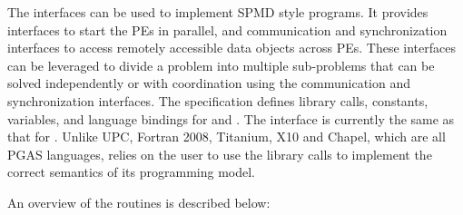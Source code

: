 
The \openshmem{} interfaces can be used to implement \ac{SPMD} style programs.  It provides interfaces to start the \openshmem{} \ac{PE}s in parallel, and communication and synchronization interfaces to access remotely accessible data objects across \ac{PE}s. These interfaces can be leveraged to divide a problem into multiple sub-problems that can be solved independently or with coordination using the communication and synchronization interfaces.  The \openshmem specification defines library calls, constants, variables, and language bindings for \Clang{} and \Fortran{}.  The \Cpp{} interface is currently the same as that for \Clang. Unlike UPC, Fortran 2008, Titanium, X10 and Chapel, which are all PGAS languages, \openshmem relies on 
the user to use the library calls  to implement the correct semantics of its programming model.

An overview of the \openshmem routines is described below:

